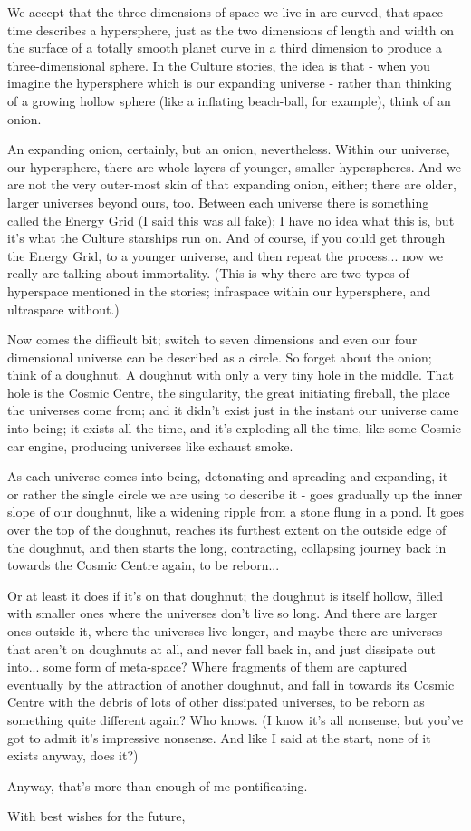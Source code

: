 We accept that the three dimensions of space we live in are curved, that space-time describes a hypersphere, just as the two dimensions of length and width on the surface of a totally smooth planet curve in a third dimension to produce a three-dimensional sphere. In the Culture stories, the idea is that - when you imagine the hypersphere which is our expanding universe - rather than thinking of a growing hollow sphere (like a inflating beach-ball, for example), think of an onion.

An expanding onion, certainly, but an onion, nevertheless. Within our universe, our hypersphere, there are whole layers of younger, smaller hyperspheres. And we are not the very outer-most skin of that expanding onion, either; there are older, larger universes beyond ours, too. Between each universe there is something called the Energy Grid (I said this was all fake); I have no idea what this is, but it's what the Culture starships run on. And of course, if you could get through the Energy Grid, to a younger universe, and then repeat the process... now we really are talking about immortality. (This is why there are two types of hyperspace mentioned in the stories; infraspace within our hypersphere, and ultraspace without.)

Now comes the difficult bit; switch to seven dimensions and even our four dimensional universe can be described as a circle. So forget about the onion; think of a doughnut. A doughnut with only a very tiny hole in the middle. That hole is the Cosmic Centre, the singularity, the great initiating fireball, the place the universes come from; and it didn't exist just in the instant our universe came into being; it exists all the time, and it's exploding all the time, like some Cosmic car engine, producing universes like exhaust smoke.

As each universe comes into being, detonating and spreading and expanding, it - or rather the single circle we are using to describe it - goes gradually up the inner slope of our doughnut, like a widening ripple from a stone flung in a pond. It goes over the top of the doughnut, reaches its furthest extent on the outside edge of the doughnut, and then starts the long, contracting, collapsing journey back in towards the Cosmic Centre again, to be reborn...

Or at least it does if it's on that doughnut; the doughnut is itself hollow, filled with smaller ones where the universes don't live so long. And there are larger ones outside it, where the universes live longer, and maybe there are universes that aren't on doughnuts at all, and never fall back in, and just dissipate out into... some form of meta-space? Where fragments of them are captured eventually by the attraction of another doughnut, and fall in towards its Cosmic Centre with the debris of lots of other dissipated universes, to be reborn as something quite different again? Who knows. (I know it's all nonsense, but you've got to admit it's impressive nonsense. And like I said at the start, none of it exists anyway, does it?)

Anyway, that's more than enough of me pontificating.

With best wishes for the future, 
